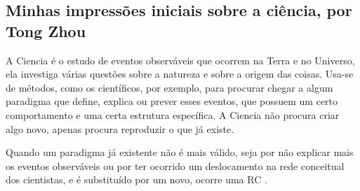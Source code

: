 \subsection{Minhas impressões iniciais sobre a ciência, por Tong Zhou}

A \gls{Ciencia} é o estudo de eventos observáveis que ocorrem na Terra e no Universo, ela investiga várias questões sobre a natureza e sobre a origem das coisas. Usa-se de métodos, como os científicos, por exemplo, para procurar chegar a algum paradigma que define, explica ou prever esses eventos, que 
possuem um certo comportamento e uma certa estrutura específica. A \gls{Ciencia} não procura criar algo novo, apenas procura reproduzir o que já existe. 

Quando um paradigma já existente não é mais válido, seja por não explicar mais os eventos observáveis ou por ter ocorrido um deslocamento na rede conceitual dos cientistas, e é substituído por um novo, ocorre uma \gls{RC} \citet{kuhn_estrutura_2001}.


